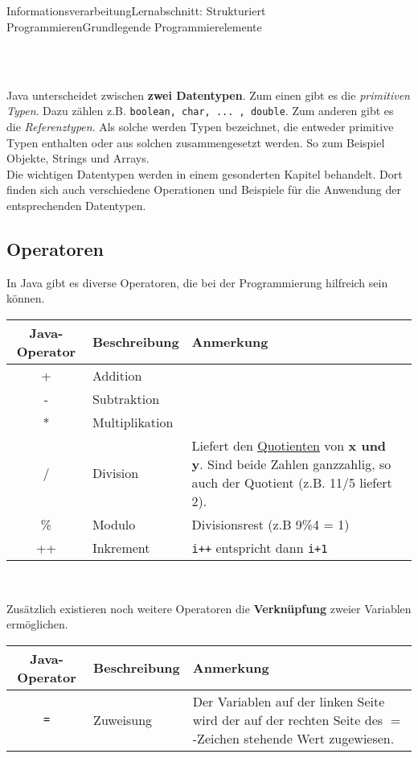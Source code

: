 \documentclass[11pt,oneside,openany,headings=optiontotoc,11pt,numbers=noenddot]{article}
\begin{document}
\begin{worksheet}{Informationsverarbeitung}{Lernabschnitt: Strukturiert Programmieren}{Grundlegende Programmierelemente}
\begin{tabularx}{\textwidth}{lXX}
			\hline
			\hline
		\end{tabularx}\\
		\par\noindent
		Java unterscheidet zwischen \textbf{zwei Datentypen}. Zum einen gibt es die \textit{primitiven Typen}. Dazu zählen z.B. \lstinline[style=Python]{boolean, char, ... , double}. Zum anderen gibt es die \textit{Referenztypen}. Als solche werden Typen bezeichnet, die entweder primitive Typen enthalten oder aus solchen zusammengesetzt werden. So zum Beispiel Objekte, Strings und Arrays.\\
		Die wichtigen Datentypen werden in einem gesonderten Kapitel behandelt. Dort finden sich auch verschiedene Operationen und Beispiele für die Anwendung der entsprechenden Datentypen.
		\subsection{Operatoren}
		In Java gibt es diverse Operatoren, die bei der Programmierung hilfreich sein können.\\
		\par\noindent
		\begin{tabularx}{\textwidth}{clXX}
			\textbf{Java-Operator} & \textbf{Beschreibung} & \textbf{Anmerkung}\\
			\hline
			\hline
			+ & Addition & \\
			\hline
			- & Subtraktion & \\
			\hline
			* & Multiplikation & \\
			\hline
			/ & Division & Liefert den \underline{Quotienten} von \textbf{x und y}. Sind beide Zahlen ganzzahlig, so auch der Quotient (z.B. 11/5 liefert 2).\\
			\hline
			\% & Modulo & Divisionsrest (z.B 9\%4 = 1)\\
			\hline
			++ & Inkrement & {\lstinline[style=Python]{i++}} entspricht dann {\lstinline[style=Python]{i+1}}\\
			\hline
			\hline
		\end{tabularx}\\
		\par\noindent
		Zusätzlich existieren noch weitere Operatoren die \textbf{Verknüpfung} zweier Variablen ermöglichen.\\
		\begin{tabularx}{\textwidth}{cXX}
			\textbf{Java-Operator} & \textbf{Beschreibung} & \textbf{Anmerkung}\\
			\hline
			\hline
			{\lstinline[style=Python]{=}} & Zuweisung & Der Variablen auf der linken Seite wird der auf der rechten Seite des \(=\)-Zeichen stehende Wert zugewiesen.\\

\end{tabularx}
\end{worksheet}
\end{document}
